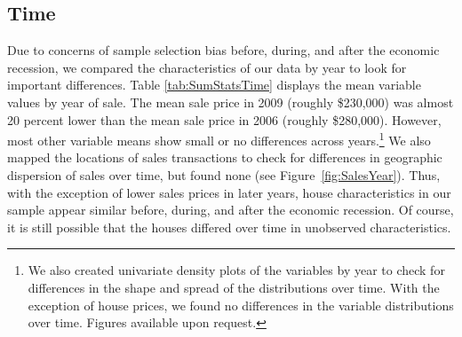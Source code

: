 \documentclass[leqno]{article}\usepackage[]{graphicx}\usepackage[]{color}
\begin{document}
\subsection*{Time}
Due to concerns of sample selection bias before, during, and after the economic recession, we compared the characteristics of our data by year to look for important differences. Table \ref{tab:SumStatsTime} displays the mean variable values by year of sale. The mean sale price in 2009 (roughly \$230,000) was almost 20 percent lower than the mean sale price in 2006 (roughly \$280,000). However, most other variable means show small or no differences across years.\footnote{We also created univariate density plots of the variables by year to check for differences in the shape and spread of the distributions over time. With the exception of house prices, we found no differences in the variable distributions over time. Figures available upon request.} We also mapped the locations of sales transactions to check for differences in geographic dispersion of sales over time, but found none (see Figure~\ref{fig:SalesYear}). Thus, with the exception of lower sales prices in later years, house characteristics in our sample appear similar before, during, and after the economic recession. Of course, it is still possible that the houses differed over time in unobserved characteristics.
\end{document}
